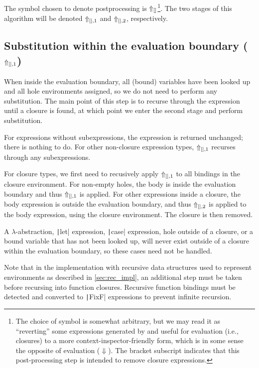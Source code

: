The symbol chosen to denote postprocessing is $\Uparrow_{[]}$\footnote{The choice of symbol is somewhat arbitrary, but we may read it as ``reverting'' some expressions generated by and useful for evaluation (i.e., closures) to a more context-inspector-friendly form, which is in some sense the opposite of evaluation ($\Downarrow$). The bracket subscript indicates that this post-processing step is intended to remove closure expressions.}. The two stages of this algorithm will be denoted $\Uparrow_{[],1}$ and $\Uparrow_{[],2}$, respectively.

\subsection{Substitution within the evaluation boundary ($\Uparrow_{[],1}$)}
\label{sec:postprocessing-subst-inside}

When inside the evaluation boundary, all (bound) variables have been looked up and all hole environments assigned, so we do not need to perform any substitution. The main point of this step is to recurse through the expression until a closure is found, at which point we enter the second stage and perform substitution.

For expressions without subexpressions, the expression is returned unchanged; there is nothing to do. For other non-closure expression types, $\Uparrow_{[],1}$ recurses through any subexpressions.

For closure types, we first need to recusively apply $\Uparrow_{[],1}$ to all bindings in the closure environment. For non-empty holes, the body is inside the evaluation boundary and thus $\Uparrow_{[],1}$ is applied. For other expressions inside a closure, the body expression is outside the evaluation boundary, and thus $\Uparrow_{[],2}$ is applied to the body expression, using the closure environment. The closure is then removed.

A $\lambda$-abstraction, \texttt|let| expression, \texttt|case| expression, hole outside of a closure, or a bound variable that has not been looked up, will never exist outside of a closure within the evaluation boundary, so these cases need not be handled.

Note that in the implementation with recursive data structures used to represent environments as described in \cref{sec:rec_impl}, an additional step must be taken before recursing into function closures. Recursive function bindings must be detected and converted to \texttt|FixF| expressions to prevent infinite recursion.

